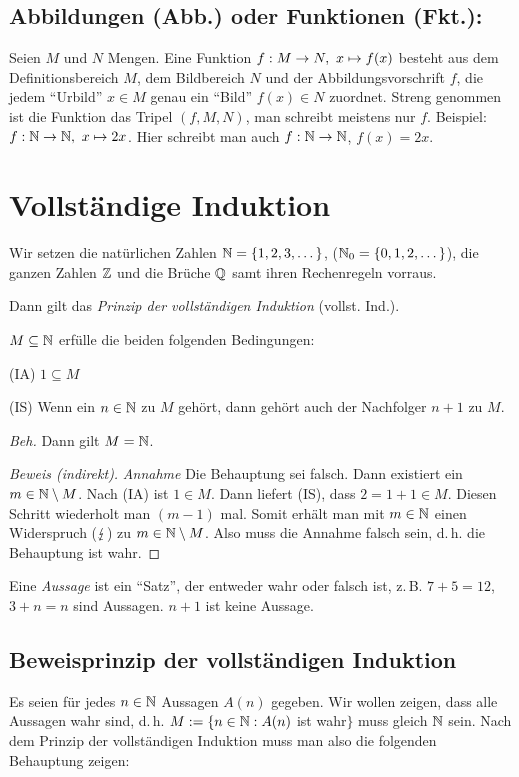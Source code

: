 \documentclass[12pt]{scrreprt}
\begin{document}
\subsection*{Abbildungen (Abb.) oder Funktionen (Fkt.):}
Seien $M$ und $N$ Mengen. Eine Funktion $f: M \rightarrow N,\ x \mapsto f(x)$ besteht aus dem Definitions\-bereich $M$, dem Bildbereich $N$ und der Abbildungsvorschrift $f$, die jedem "`Urbild"' $x \in M$ genau ein "`Bild"' $f(x) \in N$ zuordnet.
Streng genommen ist die Funktion das Tripel $(f, M, N)$, man schreibt meistens nur $f$. Beispiel: $f: \mathbb{N} \rightarrow \mathbb{N},\ x \mapsto 2x$. Hier schreibt man auch $f: \mathbb{N} \rightarrow \mathbb{N}$, $f(x) = 2x$.

\section{Vollständige Induktion}
\label{sec:vor.vollstInd}
Wir setzen die natürlichen Zahlen $\mathbb{N} = \{1, 2, 3, \dotsc\}$, ($\mathbb{N}_0 = \{0, 1, 2, \dotsc\}$), die ganzen Zahlen $\mathbb{Z}$ und die Brüche $\mathbb{Q}$ samt ihren Rechenregeln vorraus.

Dann gilt das \emph{Prinzip der vollständigen Induktion} (vollst. Ind.).

\noindent $M \subseteq \mathbb{N}$ erfülle die beiden folgenden Bedingungen:

\noindent (IA) $1 \subseteq M$

\noindent (IS) Wenn ein $n\in\mathbb{N}$ zu $M$ gehört, dann gehört auch der Nachfolger $n + 1$ zu $M$.

\noindent\emph{Beh.} Dann gilt $M = \mathbb{N}$.
\begin{proof}[Beweis (indirekt)]
\emph{Annahme} Die Behauptung sei falsch. Dann existiert ein $m\in\mathbb{N} \setminus M$. Nach (IA) ist $1 \in M$. Dann liefert (IS), dass $2 = 1 + 1 \in M$. Diesen Schritt wiederholt man $(m - 1)$ mal. Somit erhält man mit $m\in\mathbb{N}$ einen Widerspruch ($\lightning$) zu $m\in\mathbb{N} \setminus M$. Also muss die Annahme falsch sein, d.\,h. die Behauptung ist wahr.
\end{proof}

\noindent Eine \emph{Aussage} ist ein "`Satz"', der entweder wahr oder falsch ist, z.\,B. $7 + 5 = 12$, $3 + n = n$ sind Aussagen.
$n + 1$ ist keine Aussage.

\subsection*{Beweisprinzip der vollständigen Induktion}
Es seien für jedes $n\in\mathbb{N}$ Aussagen $A(n)$ gegeben. Wir wollen zeigen, dass alle Aussagen wahr sind, d.\,h. $M := \{n\in\mathbb{N}: A(n)$ ist wahr$\}$ muss gleich $\mathbb{N}$ sein. Nach dem Prinzip der vollständigen Induktion muss man also die folgenden Behauptung zeigen:
\end{document}
